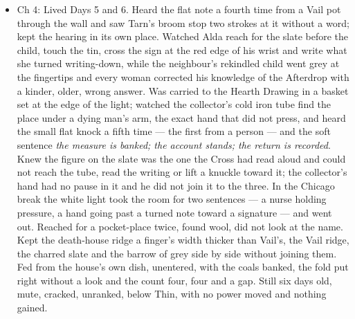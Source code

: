 \documentclass{design/chronicle}
\begin{document}
{\begin{itemize}[leftmargin=1.4em,itemsep=1pt,topsep=3pt,parsep=0pt]
\end{itemize}

\begin{itemize}[leftmargin=1.4em,itemsep=1pt,topsep=3pt,parsep=0pt]

\item Ch 4: Lived Days 5 and 6. Heard the flat note a fourth time from a Vail pot through the wall and saw Tarn’s broom stop two strokes at it without a word; kept the hearing in its own place. Watched Alda reach for the slate before the child, touch the tin, cross the sign at the red edge of his wrist and write what she turned writing-down, while the neighbour’s rekindled child went grey at the fingertips and every woman corrected his knowledge of the Afterdrop with a kinder, older, wrong answer. Was carried to the Hearth Drawing in a basket set at the edge of the light; watched the collector’s cold iron tube find the place under a dying man’s arm, the exact hand that did not press, and heard the small flat knock a fifth time --- the first from a person --- and the soft sentence \emph{the measure is banked; the account stands; the return is recorded}. Knew the figure on the slate was the one the Cross had read aloud and could not reach the tube, read the writing or lift a knuckle toward it; the collector’s hand had no pause in it and he did not join it to the three. In the Chicago break the white light took the room for two sentences --- a nurse holding pressure, a hand going past a turned note toward a signature --- and went out. Reached for a pocket-place twice, found wool, did not look at the name. Kept the death-house ridge a finger’s width thicker than Vail’s, the Vail ridge, the charred slate and the barrow of grey side by side without joining them. Fed from the house’s own dish, unentered, with the coals banked, the fold put right without a look and the count four, four and a gap. Still six days old, mute, cracked, unranked, below Thin, with no power moved and nothing gained.

\end{itemize}

\begin{itemize}[leftmargin=1.4em,itemsep=1pt,topsep=3pt,parsep=0pt]


\end{itemize}}
\end{document}
